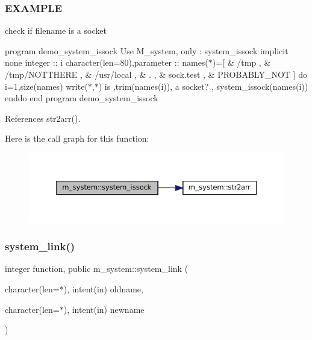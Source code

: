 \subsubsection*{E\+X\+A\+M\+P\+LE}

check if filename is a socket

program demo\+\_\+system\+\_\+issock Use M\+\_\+system, only \+: system\+\_\+issock implicit none integer \+:\+: i character(len=80),parameter \+:\+: names($\ast$)=\mbox{[} \& \textquotesingle{}/tmp \textquotesingle{}, \& \textquotesingle{}/tmp/\+N\+O\+T\+T\+H\+E\+RE \textquotesingle{}, \& \textquotesingle{}/usr/local \textquotesingle{}, \& \textquotesingle{}. \textquotesingle{}, \& \textquotesingle{}sock.\+test \textquotesingle{}, \& \textquotesingle{}P\+R\+O\+B\+A\+B\+L\+Y\+\_\+\+N\+OT \textquotesingle{}\mbox{]} do i=1,size(names) write($\ast$,$\ast$)\textquotesingle{} is \textquotesingle{},trim(names(i)),\textquotesingle{} a socket? \textquotesingle{}, system\+\_\+issock(names(i)) enddo end program demo\+\_\+system\+\_\+issock 

References str2arr().

Here is the call graph for this function\+:
\nopagebreak
\begin{figure}[H]
\begin{center}
\leavevmode
\includegraphics[width=350pt]{namespacem__system_af6eb5074fe74552bc7a5e7d00f459087_cgraph}
\end{center}
\end{figure}
\mbox{\label{namespacem__system_aa77d9c9ae68750f515ba3d04d022c43c}} 
\subsubsection{\texorpdfstring{system\+\_\+link()}{system\_link()}}
{\footnotesize\ttfamily integer function, public m\+\_\+system\+::system\+\_\+link (\begin{DoxyParamCaption}\item[{character(len=$\ast$), intent(in)}]{oldname,  }\item[{character(len=$\ast$), intent(in)}]{newname }\end{DoxyParamCaption})}



